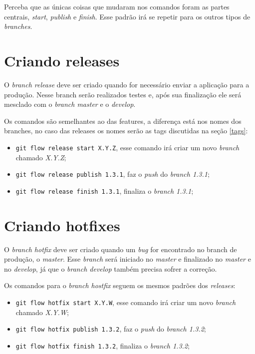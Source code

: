 \documentclass[12pt,openright,oneside,a4paper,english,brazil]{abntex2}
\begin{document}
Perceba que as únicas coisas que mudaram nos comandos foram as partes centrais, \textit{start}, \textit{publish} e \textit{finish}. Esse padrão irá se repetir para os outros tipos de \textit{branches}.

\section{Criando releases}

O \textit{branch release} deve ser criado quando for necessário enviar a aplicação para a produção. Nesse branch serão realizados testes e, após sua finalização ele será mesclado com o \textit{branch master} e o \textit{develop}.

Os comandos são semelhantes ao das features, a diferença está nos nomes dos branches, no caso das releases os nomes serão as tags discutidas na seção \ref{tags}:

\begin{itemize}
	\item \verb|git flow release start X.Y.Z|, esse comando irá criar um novo \textit{branch} chamado \textit{X.Y.Z};
	\item \verb|git flow release publish 1.3.1|, faz o \textit{push} do \textit{branch 1.3.1};
	\item \verb|git flow release finish 1.3.1|, finaliza o \textit{branch 1.3.1};
\end{itemize}

\section{Criando hotfixes}

O \textit{branch hotfix} deve ser criado quando um \textit{bug} for encontrado no branch de produção, o \textit{master}. Esse \textit{branch} será iniciado no \textit{master} e finalizado no \textit{master} e no \textit{develop}, já que o \textit{branch develop} também precisa sofrer a correção.

Os comandos para o \textit{branch hostfix} seguem os mesmos padrões dos \textit{releases}:

\begin{itemize}
	\item \verb|git flow hotfix start X.Y.W|, esse comando irá criar um novo \textit{branch} chamado \textit{X.Y.W};
	\item \verb|git flow hotfix publish 1.3.2|, faz o \textit{push} do \textit{branch 1.3.2};
	\item \verb|git flow hotfix finish 1.3.2|, finaliza o \textit{branch 1.3.2};
\end{itemize}
\end{document}
